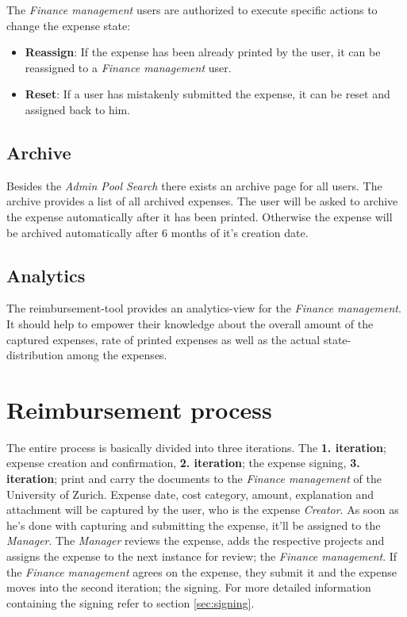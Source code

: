 The \textit{Finance management} users are authorized to execute specific actions to change the expense state:
\begin{itemize}
\item \textbf{Reassign}: If the expense has been already printed by the user, it can be reassigned to a \textit{Finance management} user.
\item \textbf{Reset}: If a user has mistakenly submitted the expense, it can be reset and assigned back to him.
\end{itemize}

\subsection{Archive}
Besides the \textit{Admin Pool Search} there exists an archive page for all users. The archive provides a list of all archived expenses. The user will be asked to archive the expense automatically after it has been printed. Otherwise the expense will be archived automatically after 6 months of it's creation date.

\subsection{Analytics}
The reimbursement-tool provides an analytics-view for the \textit{Finance management}. It should help to empower their knowledge about the overall amount of the captured expenses, rate of printed expenses as well as the actual state-distribution among the expenses.


\section{Reimbursement process}
\label{sec:process}

The entire process is basically divided into three iterations. The \textbf{1. iteration}; expense creation and confirmation, \textbf{2. iteration}; the expense signing, \textbf{3. iteration}; print and carry the documents to the \textit{Finance management} of the University of Zurich.\newline
Expense date, cost category, amount, explanation and attachment will be captured by the user, who is the expense \textit{Creator}. As soon as he's done with capturing and submitting the expense, it'll be assigned to the \textit{Manager}. The \textit{Manager} reviews the expense, adds the respective projects and assigns the expense to the next instance for review; the \textit{Finance management}. If the \textit{Finance management} agrees on the expense, they submit it and the expense moves into the second iteration; the signing. For more detailed information containing the signing refer to section \ref{sec:signing}.\newline

